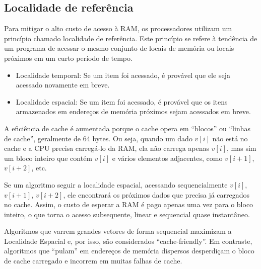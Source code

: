 \subsection{Localidade de referência}
Para mitigar o alto custo de acesso à RAM, os processadores utilizam um princípio chamado localidade de referência. Este princípio se refere à tendência de um programa de acessar o mesmo conjunto de locais de memória ou locais próximos em um curto período de tempo.

\begin{itemize}
    \item Localidade temporal: Se um item foi acessado, é provável que ele seja acessado novamente em breve.
    \item Localidade espacial: Se um item foi acessado, é provável que os itens armazenados em endereços de memória próximos sejam acessados em breve.
\end{itemize}

A eficiência de cache é aumentada porque o cache opera em ``blocos'' ou ``linhas de cache'', geralmente de 64 bytes. Ou seja, quando um dado $v[i]$ não está no cache e a CPU precisa carregá-lo da RAM, ela não carrega apenas $v[i]$, mas sim um bloco inteiro que contém $v[i]$ e vários elementos adjacentes, como $v[i+1]$, $v[i+2]$, etc.

Se um algoritmo seguir a localidade espacial, acessando sequencialmente $v[i]$, $v[i+1]$, $v[i+2]$, ele encontrará os próximos dados que precisa já carregados no cache. Assim, o custo de esperar a RAM é pago apenas uma vez para o bloco inteiro, o que torna o acesso subsequente, linear e sequencial quase instantâneo.

Algoritmos que varrem grandes vetores de forma sequencial maximizam a Localidade Espacial e, por isso, são considerados ``cache-friendly''. Em contraste, algoritmos que ``pulam'' em endereços de memória dispersos desperdiçam o bloco de cache carregado e incorrem em muitas falhas de cache.
